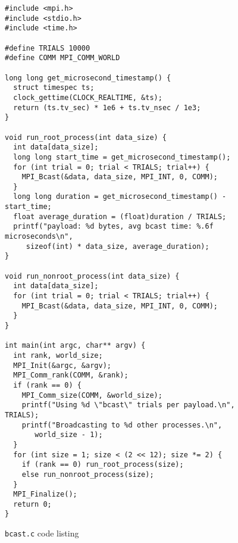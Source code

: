 \begin{figure}
\begin{Verbatim}[frame=single]
#include <mpi.h>
#include <stdio.h>
#include <time.h>

#define TRIALS 10000
#define COMM MPI_COMM_WORLD

long long get_microsecond_timestamp() {
  struct timespec ts;
  clock_gettime(CLOCK_REALTIME, &ts);
  return (ts.tv_sec) * 1e6 + ts.tv_nsec / 1e3;
}

void run_root_process(int data_size) {
  int data[data_size];
  long long start_time = get_microsecond_timestamp();
  for (int trial = 0; trial < TRIALS; trial++) {
    MPI_Bcast(&data, data_size, MPI_INT, 0, COMM);
  }
  long long duration = get_microsecond_timestamp() - start_time;
  float average_duration = (float)duration / TRIALS;
  printf("payload: %d bytes, avg bcast time: %.6f microseconds\n",
	 sizeof(int) * data_size, average_duration);
}

void run_nonroot_process(int data_size) {
  int data[data_size];
  for (int trial = 0; trial < TRIALS; trial++) {
    MPI_Bcast(&data, data_size, MPI_INT, 0, COMM);
  }
}

int main(int argc, char** argv) {
  int rank, world_size;
  MPI_Init(&argc, &argv);
  MPI_Comm_rank(COMM, &rank);
  if (rank == 0) {
    MPI_Comm_size(COMM, &world_size);
    printf("Using %d \"bcast\" trials per payload.\n", TRIALS);
    printf("Broadcasting to %d other processes.\n",
	   world_size - 1);
  }
  for (int size = 1; size < (2 << 12); size *= 2) {
    if (rank == 0) run_root_process(size);
    else run_nonroot_process(size);
  }
  MPI_Finalize();
  return 0;
}
\end{Verbatim}
    \caption{\texttt{bcast.c} code listing}
    \label{code:bcast}
\end{figure}